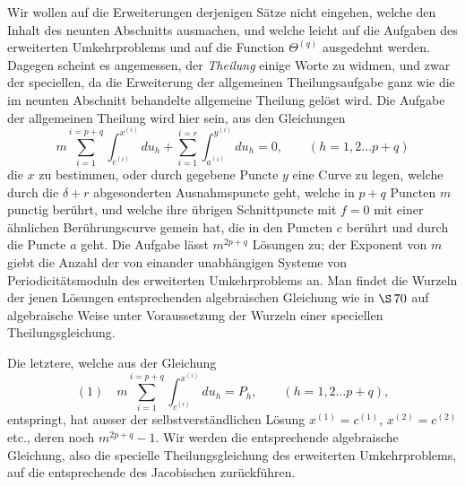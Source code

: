 \documentclass[10pt]{article}
\begin{document}
Wir wollen auf die Erweiterungen derjenigen Sätze nicht eingehen, welche den Inhalt des neunten Abschnitts ausmachen, und welche leicht auf die Aufgaben des erweiterten Umkehrproblems und auf die Function \(\Theta^{(q)}\) ausgedehnt werden. Dagegen scheint es angemessen, der \emph{Theilung} einige Worte zu widmen, und zwar der speciellen, da die Erweiterung der allgemeinen Theilungsaufgabe ganz wie die im neunten Abschnitt behandelte allgemeine Theilung gelöst wird. Die Aufgabe der allgemeinen Theilung wird hier sein, aus den Gleichungen
\[
m\sum_{i=1}^{i=p+q}\int_{c^{(i)}}^{x^{(i)}}du_h
+\sum_{i=1}^{i=r}\int_{a^{(i)}}^{y^{(i)}}du_h=0,
\qquad (h=1,2\ldots p+q)
\]
die \(x\) zu bestimmen, oder durch gegebene Puncte \(y\) eine Curve zu legen, welche durch die \(\delta+r\) abgesonderten Ausnahmspuncte geht, welche in \(p+q\) Puncten \(m\)punctig berührt, und welche ihre übrigen Schnittpuncte mit \(f=0\) mit einer ähnlichen Berührungscurve gemein hat, die in den Puncten \(c\) berührt und durch die Puncte \(a\) geht. Die Aufgabe lässt \(m^{2p+q}\) Lösungen zu; der Exponent von \(m\) giebt die Anzahl der von einander unabhängigen Systeme von Periodicitätsmoduln des erweiterten Umkehrproblems an. Man findet die Wurzeln der jenen Lösungen entsprechenden algebraischen Gleichung wie in \(\S\,70\) auf algebraische Weise unter Voraussetzung der Wurzeln einer speciellen Theilungsgleichung.

Die letztere, welche aus der Gleichung
\[
(1)\quad m\sum_{i=1}^{i=p+q}\int_{c^{(i)}}^{x^{(i)}}du_h=P_h,
\qquad (h=1,2\ldots p+q),
\]
entspringt, hat ausser der selbstverständlichen Lösung \(x^{(1)}=c^{(1)}\), \(x^{(2)}=c^{(2)}\) etc., deren noch \(m^{2p+q}-1\). Wir werden die entsprechende algebraische Gleichung, also die specielle Theilungsgleichung des erweiterten Umkehrproblems, auf die entsprechende des Jacobischen zurückführen.
\end{document}

